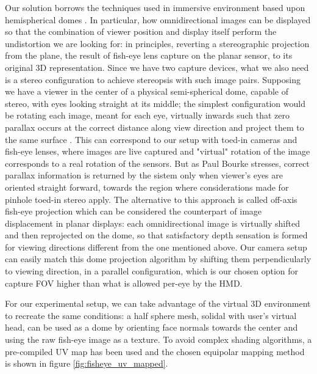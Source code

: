 Our solution borrows the techniques used in immersive environment based upon hemispherical domes \cite{immersive_displays}. In particular, how omnidirectional images can be displayed so that the combination of viewer position and display itself perform the undistortion we are looking for: in principles, reverting a stereographic projection from the plane, the result of fish-eye lens capture on the planar sensor, to its original 3D representation. Since we have two capture devices, what we also need is a stereo configuration to achieve stereopsis with such image pairs. Supposing we have a viewer in the center of a physical semi-spherical dome, capable of stereo, with eyes looking straight at its middle; the simplest configuration would be rotating each image, meant for each eye,  virtually inwards such that zero parallax occurs at the correct distance along view direction and project them to the same surface \cite{omni_fisheye}. This can correspond to our setup with toed-in cameras and fish-eye lenses, where images are live captured and "virtual" rotation of the image corresponds to a real rotation of the sensors. But as Paul Bourke stresses, correct parallax information is returned by the sistem only when viewer's eyes are oriented straight forward, towards the region where considerations made for pinhole toed-in stereo apply. The alternative to this approach is called off-axis fish-eye projection \cite{cg_projections} which can be considered the counterpart of image displacement in planar displays: each omnidirectional image is virtually shifted and then reprojected on the dome, so that satisfactory depth sensation is formed for viewing directions different from the one mentioned above. Our camera setup can easily match this dome projection algorithm by shifting them perpendicularly to viewing direction, in a parallel configuration, which is our chosen option for capture FOV higher than what is allowed per-eye by the HMD.

For our experimental setup, we can take advantage of the virtual 3D environment to recreate the same conditions: a half sphere mesh, solidal with user's virtual head,  can be used as a dome by orienting face normals towards the center and using the raw fish-eye image as a texture. To avoid complex shading algorithms, a pre-compiled UV map has been used and the chosen equipolar mapping method is shown in figure \ref{fig:fisheye_uv_mapped}.

